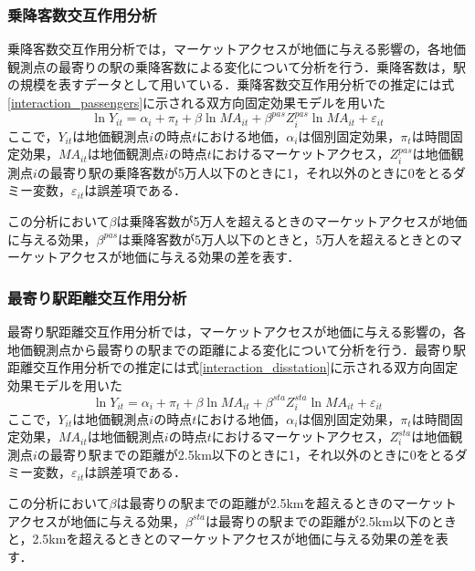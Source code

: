 \subsubsection{乗降客数交互作用分析}
乗降客数交互作用分析では，マーケットアクセスが地価に与える影響の，各地価観測点の最寄りの駅の乗降客数による変化について分析を行う．乗降客数は，駅の規模を表すデータとして用いている．乗降客数交互作用分析での推定には式\ref{interaction_passengers}に示される双方向固定効果モデルを用いた
\begin{equation}
  \ln{Y_{it}} = \alpha_{i} + \pi_{t} + \beta\ln{MA_{it}} + \beta^{pas}Z^{pas}_{i}\ln{MA_{it}} + \varepsilon_{it}
  \label{interaction_passengers}
\end{equation}
ここで，$Y_{it}$は地価観測点$i$の時点$t$における地価，$\alpha_{i}$は個別固定効果，$\pi_{t}$は時間固定効果，$MA_{it}$は地価観測点$i$の時点$t$におけるマーケットアクセス，$Z^{pas}_{i}$は地価観測点$i$の最寄り駅の乗降客数が5万人以下のときに1，それ以外のときに0をとるダミー変数，$\varepsilon_{it}$は誤差項である．

この分析において$\beta$は乗降客数が5万人を超えるときのマーケットアクセスが地価に与える効果，$\beta^{pas}$は乗降客数が5万人以下のときと，5万人を超えるときとのマーケットアクセスが地価に与える効果の差を表す．

\subsubsection{最寄り駅距離交互作用分析}
最寄り駅距離交互作用分析では，マーケットアクセスが地価に与える影響の，各地価観測点から最寄りの駅までの距離による変化について分析を行う．最寄り駅距離交互作用分析での推定には式\ref{interaction_disstation}に示される双方向固定効果モデルを用いた
\begin{equation}
  \ln{Y_{it}} = \alpha_{i} + \pi_{t} + \beta\ln{MA_{it}} + \beta^{sta}Z^{sta}_{i}\ln{MA_{it}} + \varepsilon_{it}
  \label{interaction_disstation}
\end{equation}
ここで，$Y_{it}$は地価観測点$i$の時点$t$における地価，$\alpha_{i}$は個別固定効果，$\pi_{t}$は時間固定効果，$MA_{it}$は地価観測点$i$の時点$t$におけるマーケットアクセス，$Z^{sta}_{i}$は地価観測点$i$の最寄り駅までの距離が2.5km以下のときに1，それ以外のときに0をとるダミー変数，$\varepsilon_{it}$は誤差項である．

この分析において$\beta$は最寄りの駅までの距離が2.5kmを超えるときのマーケットアクセスが地価に与える効果，$\beta^{sta}$は最寄りの駅までの距離が2.5km以下のときと，2.5kmを超えるときとのマーケットアクセスが地価に与える効果の差を表す．
